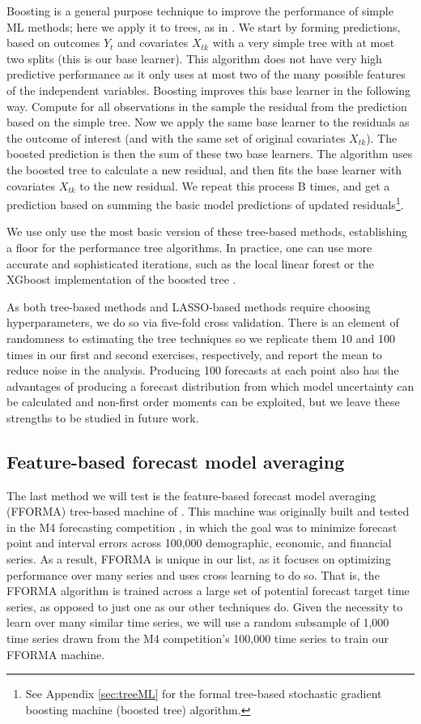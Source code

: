 \documentclass[12pt]{article}
\begin{document}
Boosting is a general purpose technique to improve the performance of simple ML methods; here we apply it to trees, as in \cite{friedman2002stochastic}.  We start by forming predictions, based on outcomes $Y_t$ and covariates $X_{tk}$ with a very simple tree with at most two splits (this is our base learner).  This algorithm does not have very high predictive performance as it only uses at most two of the many possible features of the independent variables.  Boosting improves this base learner in the following way.  Compute for all observations in the sample the residual from the prediction based on the simple tree.  Now we apply the same base learner to the residuals as the outcome of interest (and with the same set of original covariates $X_{tk}$).  The boosted prediction is then the sum of these two base learners.  The algorithm uses the boosted tree to calculate a new residual, and then fits the base learner with covariates $X_{tk}$ to the new residual.  We repeat this process B times, and get a prediction based on summing the basic model predictions of updated residuals\footnote{See Appendix \ref{sec:treeML} for the formal tree-based stochastic gradient boosting machine (boosted tree) algorithm.}. 

We use only use the most basic version of these tree-based methods, establishing a floor for the performance tree algorithms. In practice, one can use more accurate and sophisticated iterations, such as the local linear forest \cite{Friedberg2018LocalLF} or the XGboost implementation of the boosted tree \cite{CG16}. 

As both tree-based methods and LASSO-based methods require choosing hyperparameters, we do so via five-fold cross validation. There is an element of randomness to estimating the tree techniques so we replicate them 10 and 100 times in our first and second exercises, respectively, and report the mean to reduce noise in the analysis. Producing 100 forecasts at each point also has the advantages of producing a forecast distribution from which model uncertainty can be calculated and non-first order moments can be exploited, but we leave these strengths to be studied in future work.

\subsection{Feature-based forecast model averaging}
The last method we will test is the feature-based forecast model averaging (FFORMA) tree-based machine of \cite{MMAHT2018}. This machine was originally built and tested in the M4 forecasting competition \cite{makridakis2018m4}, in which the goal was to minimize forecast point and interval errors across 100,000 demographic, economic, and financial series. As a result, FFORMA is unique in our list, as it focuses on optimizing performance over many series and uses cross learning to do so. That is, the FFORMA algorithm is trained across a large set of potential forecast target time series, as opposed to just one as our other techniques do. Given the necessity to learn over many similar time series, we will use a random subsample of 1,000 time series drawn from the M4 competition's 100,000 time series to train our FFORMA machine.  
\end{document}
